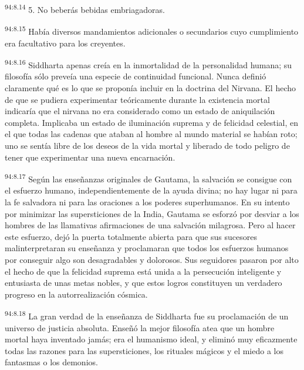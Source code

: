 \par
\textsuperscript{94:8.14} 5. No beberás bebidas embriagadoras.

\par
\textsuperscript{94:8.15} Había diversos mandamientos adicionales o secundarios cuyo cumplimiento era facultativo para los creyentes.

\par
\textsuperscript{94:8.16} Siddharta apenas creía en la inmortalidad de la personalidad humana; su filosofía sólo preveía una especie de continuidad funcional. Nunca definió claramente qué es lo que se proponía incluir en la doctrina del Nirvana. El hecho de que se pudiera experimentar teóricamente durante la existencia mortal indicaría que el nirvana no era considerado como un estado de aniquilación completa. Implicaba un estado de iluminación suprema y de felicidad celestial, en el que todas las cadenas que ataban al hombre al mundo material se habían roto; uno se sentía libre de los deseos de la vida mortal y liberado de todo peligro de tener que experimentar una nueva encarnación.

\par
\textsuperscript{94:8.17} Según las enseñanzas originales de Gautama, la salvación se consigue con el esfuerzo humano, independientemente de la ayuda divina; no hay lugar ni para la fe salvadora ni para las oraciones a los poderes superhumanos. En su intento por minimizar las supersticiones de la India, Gautama se esforzó por desviar a los hombres de las llamativas afirmaciones de una salvación milagrosa. Pero al hacer este esfuerzo, dejó la puerta totalmente abierta para que sus sucesores malinterpretaran su enseñanza y proclamaran que todos los esfuerzos humanos por conseguir algo son desagradables y dolorosos. Sus seguidores pasaron por alto el hecho de que la felicidad suprema está unida a la persecución inteligente y entusiasta de unas metas nobles, y que estos logros constituyen un verdadero progreso en la autorrealización cósmica.

\par
\textsuperscript{94:8.18} La gran verdad de la enseñanza de Siddharta fue su proclamación de un universo de justicia absoluta. Enseñó la mejor filosofía atea que un hombre mortal haya inventado jamás; era el humanismo ideal, y eliminó muy eficazmente todas las razones para las supersticiones, los rituales mágicos y el miedo a los fantasmas o los demonios.

